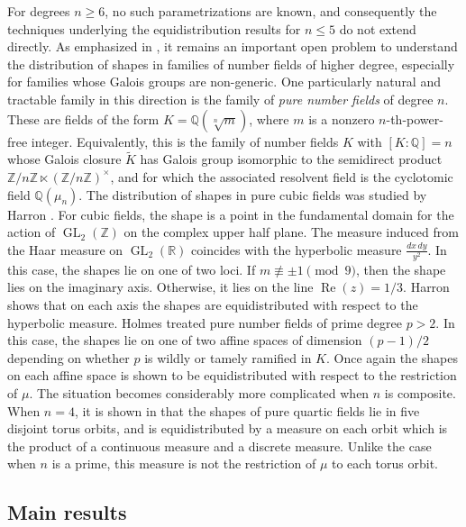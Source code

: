 \documentclass[table]{amsart}
\newcommand{\Z}{\mathbb{Z}}
\newcommand{\Q}{\mathbb{Q}}
\newcommand{\op}[1]{\operatorname{#1}}
\numberwithin{equation}{section}
\begin{document}
For degrees $n\ge 6$, no such parametrizations are known, and consequently the techniques underlying the equidistribution results for $n\le 5$ do not extend directly. As emphasized in \cite{BH16}, it remains an important open problem to understand the distribution of shapes in families of number fields of higher degree, especially for families whose Galois groups are non-generic. One particularly natural and tractable family in this direction is the family of \emph{pure number fields} of degree \(n\). These are fields of the form \(K=\Q(\sqrt[n]{m})\), where \(m\) is a nonzero \(n\)-th-power-free integer. Equivalently, this is the family of number fields \(K\) with \([K:\Q]=n\) whose Galois closure \(\widetilde{K}\) has Galois group isomorphic to the semidirect product \(\Z/n\Z \ltimes (\Z/n\Z)^\times\), and for which the associated resolvent field is the cyclotomic field \(\Q(\mu_n)\). The distribution of shapes in pure cubic fields was studied by Harron \cite{Har17}. For cubic fields, the shape is a point in the fundamental domain for the action of $\op{GL}_2(\Z)$ on the complex upper half plane. The measure induced from the Haar measure on $\op{GL}_2(\mathbb{R})$ coincides with the hyperbolic measure $\frac{dx\,dy}{y^2}$. In this case, the shapes lie on one of two loci. If $m\not \equiv \pm 1\pmod{9}$, then the shape lies on the imaginary axis. Otherwise, it lies on the line $\op{Re}(z)=1/3$. Harron shows that on each axis the shapes are equidistributed with respect to the hyperbolic measure. Holmes \cite{Hol22} treated pure number fields of prime degree $p>2$. In this case, the shapes lie on one of two affine spaces of dimension $(p-1)/2$ depending on whether $p$ is wildly or tamely ramified in $K$. Once again the shapes on each affine space is shown to be equidistributed with respect to the restriction of $\mu$. The situation becomes considerably more complicated when $n$ is composite. When $n=4$, it is shown in \cite{purequartic} that the shapes of pure quartic fields lie in five disjoint torus orbits, and is equidistributed by a measure on each orbit which is the product of a continuous measure and a discrete measure. Unlike the case when $n$ is a prime, this measure is not the restriction of $\mu$ to each torus orbit.
\subsection{Main results}
\end{document}
